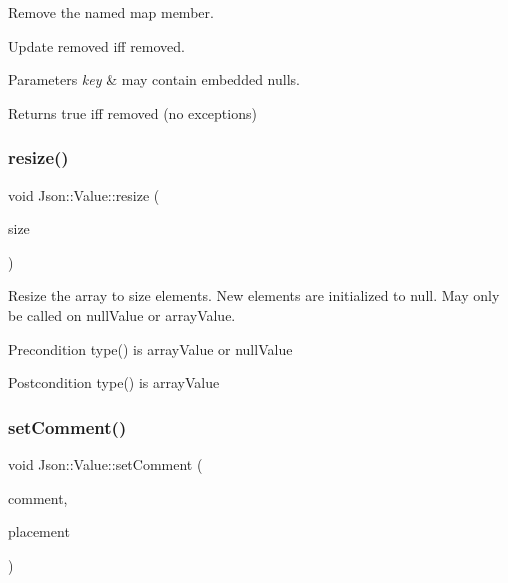 Remove the named map member. 

Update \textquotesingle{}removed\textquotesingle{} iff removed. 
\begin{DoxyParams}{Parameters}
{\em key} & may contain embedded nulls. \\
\hline
\end{DoxyParams}
\begin{DoxyReturn}{Returns}
true iff removed (no exceptions) 
\end{DoxyReturn}
\mbox{\label{class_json_1_1_value_aa284353271ada427dbfa04a42f2be407}} 
\subsubsection{\texorpdfstring{resize()}{resize()}}
{\footnotesize\ttfamily void Json\+::\+Value\+::resize (\begin{DoxyParamCaption}\item[{Array\+Index}]{size }\end{DoxyParamCaption})}

Resize the array to size elements. New elements are initialized to null. May only be called on null\+Value or array\+Value. \begin{DoxyPrecond}{Precondition}
type() is array\+Value or null\+Value 
\end{DoxyPrecond}
\begin{DoxyPostcond}{Postcondition}
type() is array\+Value 
\end{DoxyPostcond}
\mbox{\label{class_json_1_1_value_a29f3a30f7e5d3af6f38d57999bf5b480}} 
\subsubsection{\texorpdfstring{set\+Comment()}{setComment()}}
{\footnotesize\ttfamily void Json\+::\+Value\+::set\+Comment (\begin{DoxyParamCaption}\item[{const char $\ast$}]{comment,  }\item[{\hyperlink{namespace_json_a4fc417c23905b2ae9e2c47d197a45351}{Comment\+Placement}}]{placement }\end{DoxyParamCaption})}

